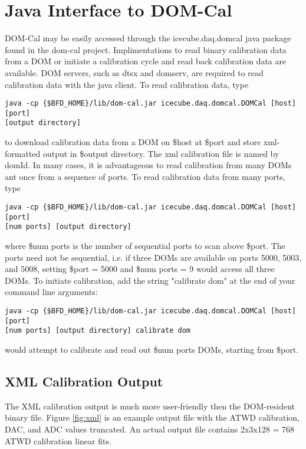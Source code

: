 \documentclass[10pt]{article}
\begin{document}
\section{Java Interface to DOM-Cal}

DOM-Cal may be easily accessed through the icecube.daq.domcal java package found
in the dom-cal project.  Implimentations to read binary calibration data from a DOM
or initiate a calibration cycle and read back calibration data are available.  DOM
servers, such as dtsx and domserv, are required to read calibration data with the
java client.  To read calibration data, type
\begin{verbatim}
java -cp {$BFD_HOME}/lib/dom-cal.jar icecube.daq.domcal.DOMCal [host] [port]
[output directory]
\end{verbatim}
to download calibration data from a DOM on \$host at \$port and store xml-formatted
output in \$output directory.  The xml calibration file is named by domId.  In many
cases, it is advantageous to read calibration from many DOMs ant once from a sequence
of ports.  To read calibration data from many ports, type
\begin{verbatim}
java -cp {$BFD_HOME}/lib/dom-cal.jar icecube.daq.domcal.DOMCal [host] [port]
[num ports] [output directory]
\end{verbatim}
where \$num ports is the number of sequential ports to scan above \$port.  The ports
need not be sequential, i.e. if three DOMs are available on ports 5000, 5003, and 5008,
setting \$port = 5000 and \$num ports = 9 would access all three DOMs.  To initiate
calibration, add the string "calibrate dom" at the end of your command line arguments:
\begin{verbatim}
java -cp {$BFD_HOME}/lib/dom-cal.jar icecube.daq.domcal.DOMCal [host] [port]
[num ports] [output directory] calibrate dom
\end{verbatim}
would attempt to calibrate and read out \$num ports DOMs, starting from \$port.

\subsection{XML Calibration Output}

The XML calibration output is much more user-friendly then the DOM-resident binary
file.  Figure \ref{fig:xml} is an example output file with the ATWD calibration,
DAC, and ADC values truncated.
An actual output file contains 2x3x128 = 768 ATWD calibration linear fits.
\end{document}
